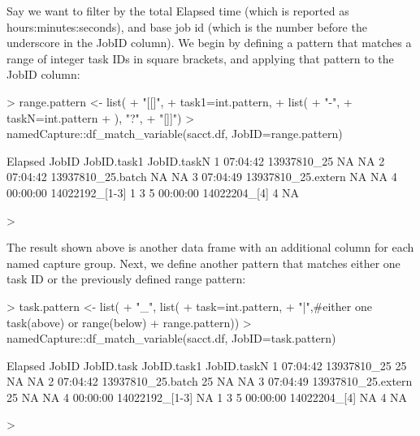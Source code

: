 Say we want to filter by the total Elapsed time (which is reported as
hours:minutes:seconds), and base job id (which is the number before
the underscore in the JobID column). We begin by defining a pattern
that matches a range of integer task IDs in square brackets, and applying that
pattern to the JobID column:

\begin{Schunk}
\begin{Sinput}
> range.pattern <- list(
+   "[[]",
+   task1=int.pattern,
+   list(
+     "-",
+     taskN=int.pattern
+   ), "?",
+   "[]]")
> namedCapture::df_match_variable(sacct.df, JobID=range.pattern)
\end{Sinput}
\begin{Soutput}
   Elapsed              JobID JobID.task1 JobID.taskN
1 07:04:42        13937810_25          NA          NA
2 07:04:42  13937810_25.batch          NA          NA
3 07:04:49 13937810_25.extern          NA          NA
4 00:00:00     14022192_[1-3]           1           3
5 00:00:00       14022204_[4]           4          NA
\end{Soutput}
\begin{Sinput}
> 
\end{Sinput}
\end{Schunk}

The result shown above is another data frame with an additional column for each
named capture group. 
Next, we define another pattern that matches either one task ID
or the previously defined range pattern:

\begin{Schunk}
\begin{Sinput}
> task.pattern <- list(
+   "_", list(
+     task=int.pattern,
+     "|",#either one task(above) or range(below)
+     range.pattern))
> namedCapture::df_match_variable(sacct.df, JobID=task.pattern)
\end{Sinput}
\begin{Soutput}
   Elapsed              JobID JobID.task JobID.task1 JobID.taskN
1 07:04:42        13937810_25         25          NA          NA
2 07:04:42  13937810_25.batch         25          NA          NA
3 07:04:49 13937810_25.extern         25          NA          NA
4 00:00:00     14022192_[1-3]         NA           1           3
5 00:00:00       14022204_[4]         NA           4          NA
\end{Soutput}
\begin{Sinput}
> 
\end{Sinput}
\end{Schunk}


